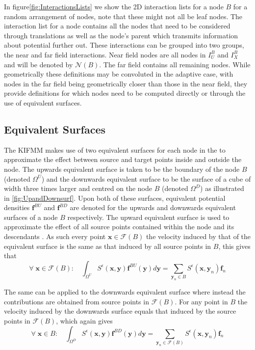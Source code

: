 In figure\ref{fig:InteractionsLists} we show the 2D interaction lists for a node $B$ for a random arrangement of nodes, note that these might not all be leaf nodes. The interaction list for a node contains all the nodes that need to be considered through translations as well as the node's parent which transmits information about potential further out. These interactions can be grouped into two groups, the near and far field interactions. Near field nodes are all nodes in $I_U^B$ and $I_X^B$ and will be denoted by $\mathcal{N}(B)$. The far field contains all remaining nodes. While geometrically these definitions may be convoluted in the adaptive case, with nodes in the far field being geometrically closer than those in the near field, they provide definitions for which nodes need to be computed directly or through the use of equivalent surfaces.

\subsection{Equivalent Surfaces}

The KIFMM makes use of two equivalent surfaces for each node in the  to approximate the effect between source and target points inside and outside the node. The upwards equivalent surface is taken to be the boundary of the node $B$ (denoted $\Omega^U$) and the downwards equivalent surface to be the surface of a cube of width three times larger and centred on the node $B$ \cite{Ying2004} (denoted $\Omega^D$) as illustrated in \cref{fig:UpandDownsurf}. Upon both of these surfaces, equivalent potential densities $\bm{f}^{BU}$ and $\bm{f}^{BD}$ are denoted for the upwards and downwards equivalent surfaces of a node $B$ respectively. The upward equivalent surface is used to approximate the effect of all source points contained within the node and its descendants \cite{Rostami2016Kernel-independentStokeslets,Yan}. As such every point $\bm{x}\in\mathcal{F}(B)$ the velocity induced by that of the equivalent surface is the same as that induced by all source points in $B$, this gives that
\begin{equation}
\label{eq:upsurfint}
    \forall \;\bm{x} \in \mathcal{F}(B): \quad \int_{\Omega^U} S^\epsilon(\bm{x}, \bm{y}) \bm{f}^{BU}(\bm{y}) d \bm{y}=\sum_{{\bm{y}}_n \in B} S^\epsilon\left(\bm{x}, {\bm{y}}_n\right) {\bm{f}}_{n}
\end{equation}

The same can be applied to the downwards equivalent surface where instead the contributions are obtained from source points in $\mathcal{F}(B)$. For any point in $B$ the velocity induced by the downwards surface equals that induced by the source points in $\mathcal{F}(B)$, which again gives
\begin{equation}
\label{eq:downsurfint}
    \forall \;\bm{x} \in B: \quad \int_{\Omega^D} S^\epsilon(\bm{x}, \bm{y}) \bm{f}^{BD}(\bm{y}) d \bm{y}=\sum_{{\bm{y}}_n \in \mathcal{F}(B)} S^\epsilon\left(\bm{x}, {\bm{y}}_n\right) {\bm{f}}_{n}
\end{equation}

